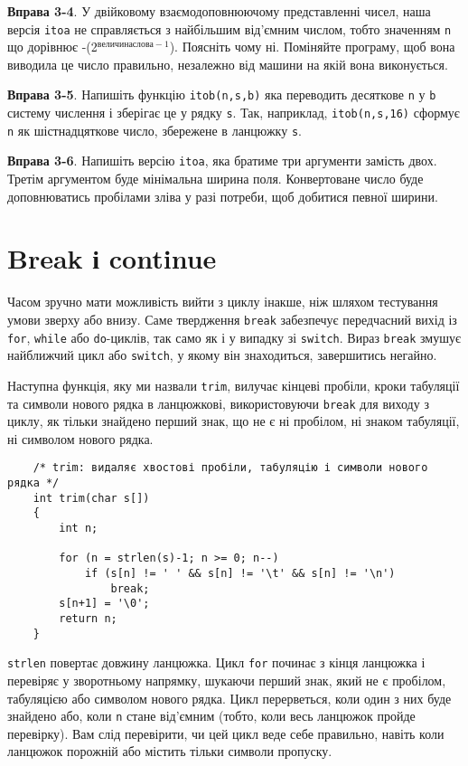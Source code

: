 \documentclass[a4paper,12pt]{book}
\begin{document}
  \textbf{Вправа 3-4}. У двійковому взаємодоповнюючому представленні чисел, наша версія
  \texttt{itoa} не справляється з найбільшим від'ємним числом, тобто значенням \texttt{n}
  що дорівнює -(2\(^{величина слова-1}\)). Поясніть чому ні. Поміняйте програму, щоб
  вона виводила це число правильно, незалежно від машини на якій вона виконується.

  \textbf{Вправа 3-5}. Напишіть функцію \texttt{itob(n,s,b)} яка переводить десяткове
  \texttt{n} у \texttt{b} систему числення і зберігає це у рядку \texttt{s}. Так,
  наприклад, \texttt{itob(n,s,16)} сформує \texttt{n} як шістнадцяткове число, збережене в
  ланцюжку \texttt{s}.

  \textbf{Вправа 3-6}. Напишіть версію \texttt{itoa}, яка братиме три аргументи замість
  двох. Третім аргументом буде мінімальна ширина поля. Конвертоване число буде
  доповнюватись пробілами зліва у разі потреби, щоб добитися певної ширини.

\section{Break і continue}

\label{f0:ch3.7}
  Часом зручно мати можливість вийти з циклу інакше, ніж шляхом тестування умови зверху
  або внизу. Саме твердження \texttt{break} забезпечує передчасний вихід із \texttt{for},
  \texttt{while} або \texttt{do}-циклів, так само як і у випадку зі \texttt{switch}. Вираз
  \texttt{break} змушує найближчий цикл або \texttt{switch}, у якому він знаходиться,
  завершитись негайно.

  Наступна функція, яку ми назвали \texttt{trim}, вилучає кінцеві пробіли, кроки табуляції
  та символи нового рядка в ланцюжкові, використовуючи \texttt{break} для виходу з циклу,
  як тільки знайдено перший знак, що не є ні пробілом, ні знаком табуляції, ні символом
  нового рядка.
  \begin{verbatim}
    /* trim: видаляє хвостові пробіли, табуляцію і символи нового рядка */
    int trim(char s[])
    {
        int n;

        for (n = strlen(s)-1; n >= 0; n--)
            if (s[n] != ' ' && s[n] != '\t' && s[n] != '\n')
                break;
        s[n+1] = '\0';
        return n;
    }
  \end{verbatim}

  \texttt{strlen} повертає довжину ланцюжка. Цикл \texttt{for} починає з кінця ланцюжка і
  перевіряє у зворотньому напрямку, шукаючи перший знак, який не є пробілом,
  табуляцією або символом нового рядка. Цикл перерветься, коли один з них буде знайдено
  або, коли \texttt{n} стане від'ємним (тобто, коли весь ланцюжок пройде перевірку). Вам
  слід перевірити, чи цей цикл веде себе правильно, навіть коли ланцюжок порожній або
  містить тільки символи пропуску.
\end{document}
